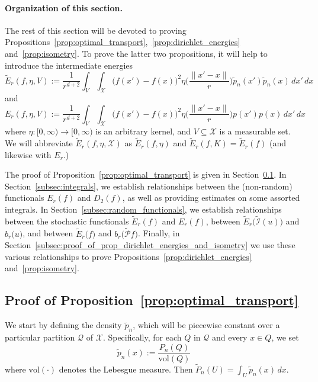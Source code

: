 \documentclass[twoside]{article}
\newcommand{\vol}{\text{vol}}
\newcommand{\1}{\mathbf{1}}
\newcommand{\Xset}{\mathcal{X}}
\newcommand{\mc}[1]{\mathcal{#1}}
\newcommand{\dx}{\,dx}
\newcommand{\wt}[1]{\widetilde{#1}}
\theoremstyle{definition}
\theoremstyle{remark}
\begin{document}
\paragraph{Organization of this section.}
The rest of this section will be devoted to proving Propositions~\ref{prop:optimal_transport},~\ref{prop:dirichlet_energies} and~\ref{prop:isometry}. To prove the latter two propositions, it will help to introduce the intermediate energies
\begin{equation*}
\wt{E}_r(f,\eta,V) := \frac{1}{r^{d + 2}}\int_{V} \int_{\Xset} \bigl(f(x') - f(x)\bigr)^2 \eta\biggl(\frac{\|x' - x\|}{r}\biggr) \wt{p}_n(x') \wt{p}_n(x) \,dx' \,dx
\end{equation*}
and
\begin{equation*}
{E}_r(f,\eta,V) := \frac{1}{r^{d + 2}}\int_{V} \int_{\Xset} \bigl(f(x') - f(x)\bigr)^2 \eta\biggl(\frac{\|x' - x\|}{r}\biggr) p(x') p(x) \,dx' \,dx
\end{equation*}
where $\eta: [0,\infty) \to [0,\infty)$ is an arbitrary kernel, and $V \subseteq \Xset$ is a measurable set. We will abbreviate $\wt{E}_r(f,\eta,\Xset)$ as $\wt{E}_r(f,\eta)$ and $\wt{E}_r(f,K) = \wt{E}_r(f)$ (and likewise with $E_r$.)

The proof of Proposition~\ref{prop:optimal_transport} is given in Section~\ref{subsec:proof_proposition_optimal_transport}. In Section~\ref{subsec:integrals}, we establish relationships between the (non-random) functionals $E_r(f)$ and $D_2(f)$, as well as providing estimates on some assorted integrals. In Section~\ref{subsec:random_functionals}, we establish relationships between the stochastic functionals $\wt{E}_r(f)$ and $E_r(f)$,  between $\wt{E}_r\bigl(\wt{\mc{I}}(u)\bigr)$ and $b_r\bigl(u\bigr)$, and between $\wt{E}_r\bigl(f\bigr)$ and $b_r\bigl(\wt{\mc{P}}f\bigr)$. Finally, in Section~\ref{subsec:proof_of_prop_dirichlet_energies_and_isometry} we use these various relationships to prove Propositions~\ref{prop:dirichlet_energies} and~\ref{prop:isometry}.

\subsection{Proof of Proposition~\ref{prop:optimal_transport}}
\label{subsec:proof_proposition_optimal_transport}

We start by defining the density $\wt{p}_n$, which will be piecewise constant over a particular partition $\mc{Q}$ of $\Xset$. Specifically, for each $Q$ in $\mc{Q}$ and every $x \in Q$, we set
\begin{equation}
\label{pf:prop_optimal_transport_0}
\wt{p}_n(x) := \frac{P_n(Q)}{\vol(Q)}
\end{equation}
where $\vol(\cdot)$ denotes the Lebesgue measure. Then $\wt{P}_n(U) = \int_{U} \wt{p}_n(x) \dx$.
\end{document}
